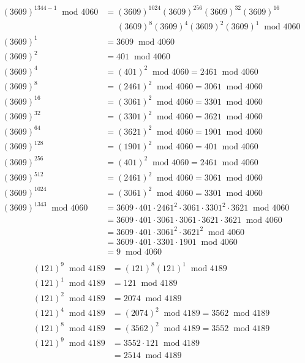 \documentclass{article}
\begin{document}
\begin{align*}
(3609)^{1344-1}\;\;\text{mod }4060&=(3609)^{1024}(3609)^{256}(3609)^{32}(3609)^{16}\\
&\;\;\;\;\;(3609)^{8}(3609)^{4}(3609)^{2}(3609)^{1}\;\;\text{mod }4060\\
(3609)^{1}&=3609\;\;\text{mod }4060\\
(3609)^{2}&=401\;\;\text{mod }4060\\
(3609)^{4}&=(401)^{2}\;\;\text{mod }4060=2461\;\;\text{mod }4060\\
(3609)^{8}&=(2461)^{2}\;\;\text{mod }4060=3061\;\;\text{mod }4060\\
(3609)^{16}&=(3061)^{2}\;\;\text{mod }4060=3301\;\;\text{mod }4060\\
(3609)^{32}&=(3301)^{2}\;\;\text{mod }4060=3621\;\;\text{mod }4060\\
(3609)^{64}&=(3621)^{2}\;\;\text{mod }4060=1901\;\;\text{mod }4060\\
(3609)^{128}&=(1901)^{2}\;\;\text{mod }4060=401\;\;\text{mod }4060\\
(3609)^{256}&=(401)^{2}\;\;\text{mod }4060=2461\;\;\text{mod }4060\\
(3609)^{512}&=(2461)^{2}\;\;\text{mod }4060=3061\;\;\text{mod }4060\\
(3609)^{1024}&=(3061)^{2}\;\;\text{mod }4060=3301\;\;\text{mod }4060\\
(3609)^{1343}\;\;\text{mod }4060&=3609\cdot401\cdot2461^2\cdot3061\cdot3301^2\cdot3621\;\;\text{mod }4060\\
&=3609\cdot401\cdot3061\cdot3061\cdot3621\cdot3621\;\;\text{mod }4060\\
&=3609\cdot401\cdot3061^2\cdot3621^2\;\;\text{mod }4060\\
&=3609\cdot401\cdot3301\cdot1901\;\;\text{mod }4060\\
&=9\;\;\text{mod }4060\\
\end{align*}
\begin{align*}
(121)^{9}\;\;\text{mod }4189&=(121)^{8}(121)^{1}\;\;\text{mod }4189\\
(121)^{1}\;\;\text{mod }4189&=121\;\;\text{mod }4189\\
(121)^{2}\;\;\text{mod }4189&=2074\;\;\text{mod }4189\\
(121)^{4}\;\;\text{mod }4189&=(2074)^2\;\;\text{mod }4189=3562\;\;\text{mod }4189\\
(121)^{8}\;\;\text{mod }4189&=(3562)^2\;\;\text{mod }4189=3552\;\;\text{mod }4189\\
(121)^{9}\;\;\text{mod }4189&=3552\cdot121\;\;\text{mod }4189\\
&=2514\;\;\text{mod }4189\\
\end{align*}
\end{document}
